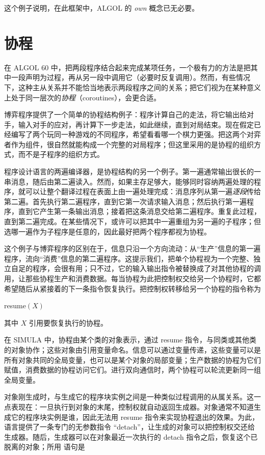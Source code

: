 这个例子说明，在此框架中，ALGOL 的 \textit{own} 概念已无必要。

\section{协程}

在 ALGOL 60 中，把两段程序结合起来完成某项任务，一个极有力的方法是把其中一段声明为过程，再从另一段中调用它（必要时反复调用）。然而，有些情况下，这种主从关系并不能恰当地表示两段程序之间的关系；把它们视为在某种意义上处于同一层次的\textit{协程}（coroutines），会更合适。

博弈程序提供了一个简单的协程结构例子：程序计算自己的走法，将它输出给对手，输入对手的应对，再计算下一步走法，如此继续，直到对局结束。现在假定已经编写了两个玩同一种游戏的不同程序，希望看看哪一个棋力更强。把这两个对弈者作为组件，很自然就能构成一个完整的对局程序；但这里采用的是协程的组织方式，而不是子程序的组织方式。

程序设计语言的两遍编译器，是协程结构的另一个例子。第一遍通常输出很长的一串消息，随后由第二遍读入。然而，如果主存足够大，能够同时容纳两遍处理的程序，就可以让整个翻译过程在表面上由一遍处理完成：消息序列从第一遍\textit{逐段}传给第二遍。首先执行第二遍程序，直到它第一次请求输入消息；然后执行第一遍程序，直到它产生第一条输出消息；接着把这条消息交给第二遍程序。重复此过程，直到第二遍完成。在某些情况下，或许可以把其中一遍重组为另一遍的子程序；但选哪一遍作为子程序是任意的，因此最好把两个程序都视为协程。

这个例子与博弈程序的区别在于，信息只沿一个方向流动：从“生产”信息的第一遍程序，流向“消费”信息的第二遍程序。这提示我们，把单个协程视为一个完整、独立自足的程序，会很有用；只不过，它的输入输出指令被替换成了对其他协程的调用，让那些协程生产和消费数据。每当协程为此把控制权交给另一个协程时，它都希望随后从紧接着的下一条指令恢复执行。把控制权转移给另一个协程的指令称为

\quad resume$(X)$

\noindent
其中 $X$ 引用要恢复执行的协程。

在 SIMULA 中，协程由某个类的对象表示，通过 resume 指令，与同类或其他类的对象协作；这些对象由引用变量命名。信息可以通过变量传递，这些变量可以是所有对象共同的全局变量，也可以是某个对象的局部变量；生产数据的协程为它们赋值，消费数据的协程访问它们。进行双向通信时，两个协程可以轮流更新同一组全局变量。

对象刚生成时，与生成它的程序块实例之间是一种类似过程调用的从属关系。这一点表现在：一旦执行到对象的末尾，控制权就自动返回生成器。对象通常不知道生成它的程序块实例是谁，因此无法用 resume 指令来实现协程退出的效果。为此，语言提供了一条专门的无参数指令 ``detach''，让生成的对象可以把控制权交还给生成器。随后，生成器可以在对象最近一次执行的 detach 指令之后，恢复这个已脱离的对象；所用
语句是

